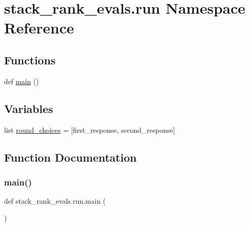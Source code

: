 \hypertarget{namespacestack__rank__evals_1_1run}{}\section{stack\+\_\+rank\+\_\+evals.\+run Namespace Reference}
\label{namespacestack__rank__evals_1_1run}
\subsection*{Functions}
\begin{DoxyCompactItemize}
\item 
def \hyperlink{namespacestack__rank__evals_1_1run_a5e968ebe737f4f8e703b5be5bec893bf}{main} ()
\end{DoxyCompactItemize}
\subsection*{Variables}
\begin{DoxyCompactItemize}
\item 
list \hyperlink{namespacestack__rank__evals_1_1run_aa9e7faafd240a56b1961d5f2d8ecdf6d}{round\+\_\+choices} = \mbox{[}\textquotesingle{}first\+\_\+response\textquotesingle{}, \textquotesingle{}second\+\_\+response\textquotesingle{}\mbox{]}
\end{DoxyCompactItemize}


\subsection{Function Documentation}
\mbox{\label{namespacestack__rank__evals_1_1run_a5e968ebe737f4f8e703b5be5bec893bf}} 
\subsubsection{\texorpdfstring{main()}{main()}}
{\footnotesize\ttfamily def stack\+\_\+rank\+\_\+evals.\+run.\+main (\begin{DoxyParamCaption}{ }\end{DoxyParamCaption})}

